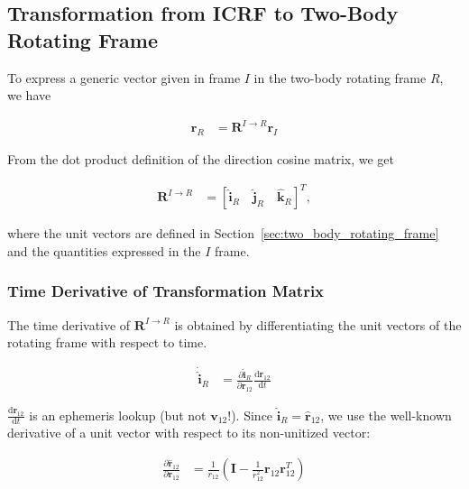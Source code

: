 \documentclass[]{article}
\newcommand{\vb}[1]{\bm{#1}} %
\newcommand{\vbh}[1]{\hat{\bm{#1}}} %
\newcommand{\ddt}[1]{\frac{\mathrm{d} #1}{\mathrm{d} t}} %
\newcommand{\pd}[2]{\frac{\partial #1}{\partial #2}} %
\newcommand{\vbr}[0]{\vb{r}}
\newcommand{\vbv}[0]{\vb{v}}
\begin{document}
\subsection{Transformation from ICRF to Two-Body Rotating Frame}
\label{sec:icrf_to_two_body_rotating_frame}

To express a generic vector given in frame $I$ in the two-body rotating frame $R$, we have

\begin{align}
\label{eq:transformation_matrix}
\vb{r}_{R} &= \vb{R}^{I \rightarrow R} \vb{r}_{I}
\end{align}

\noindent From the dot product definition of the direction cosine matrix, we get

\begin{align}
\vb{R}^{I \rightarrow R} &= \left[ \vbh{i}_R \quad\vbh{j}_R \quad \vbh{k}_R \right]^T,
\end{align}

\noindent where the unit vectors are defined in Section~\ref{sec:two_body_rotating_frame} and the quantities expressed in the $I$ frame.

\subsubsection{Time Derivative of Transformation Matrix}
\label{sec:time_derivative_of_transformation_matrix}

The time derivative of $\vb{R}^{I \rightarrow R}$ is obtained by differentiating the unit vectors of the rotating frame with respect to time.

\begin{align}
	\dot{\vbh{i}}_R &= \pd{\vbh{i}_R}{\vbr_{12}} \ddt{\vbr_{12}}
\end{align}

\noindent $\ddt{\vbr_{12}}$ is an ephemeris lookup (but not $\vbv_{12}$!). Since $\vbh{i}_R = \vbh{r}_{12}$, we use the well-known derivative of a unit vector with respect to its non-unitized vector:

\begin{align}
	\pd{\vbh{r}_{12}}{\vbr_{12}} &= \frac{1}{r_{12}} \left( \vb{I} - \frac{1}{r_{12}^2} \vb{r}_{12} \vb{r}_{12}^T \right)
\end{align}
\end{document}
